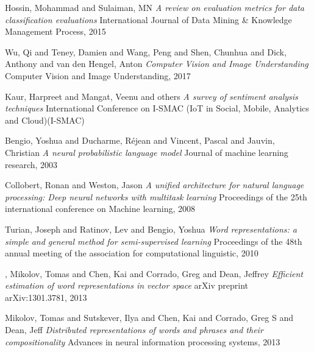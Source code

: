 \begin{thebibliography}{9}
Hossin, Mohammad and Sulaiman, MN\newline
\textit{A review on evaluation metrics for data classification evaluations}\newline
International Journal of Data Mining \& Knowledge Management Process, 2015

Wu, Qi and Teney, Damien and Wang, Peng and Shen, Chunhua and Dick, Anthony and van den Hengel, Anton\newline
\textit{Computer Vision and Image Understanding}
Computer Vision and Image Understanding, 2017

Kaur, Harpreet and Mangat, Veenu and others\newline
\textit{A survey of sentiment analysis techniques} International Conference on I-SMAC (IoT in Social, Mobile, Analytics and Cloud)(I-SMAC)

Bengio, Yoshua and Ducharme, R{\'e}jean and Vincent, Pascal and Jauvin, Christian\newline
\textit{A neural probabilistic language model}\newline
Journal of machine learning research, 2003

Collobert, Ronan and Weston, Jason\newline
\textit{A unified architecture for natural language processing: Deep neural networks with multitask learning}\newline
Proceedings of the 25th international conference on Machine learning, 2008

Turian, Joseph and Ratinov, Lev and Bengio, Yoshua\newline
\textit{Word representations: a simple and general method for semi-supervised learning}\newline
Proceedings of the 48th annual meeting of the association for computational linguistic, 2010

,
Mikolov, Tomas and Chen, Kai and Corrado, Greg and Dean, Jeffrey\newline
\textit{Efficient estimation of word representations in vector space}\newline
arXiv preprint arXiv:1301.3781, 2013

Mikolov, Tomas and Sutskever, Ilya and Chen, Kai and Corrado, Greg S and Dean, Jeff\newline
\textit{Distributed representations of words and phrases and their compositionality}\newline
Advances in neural information processing systems, 2013


\end{thebibliography}
